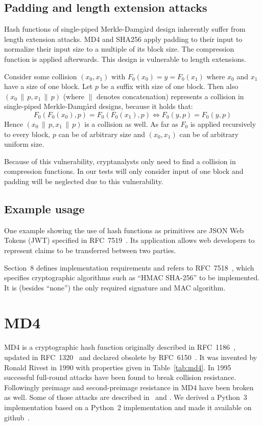 \subsection{Padding and length extension attacks}
\label{sec:hash-length-ext-attack}
%
Hash functions of single-piped Merkle-Damg\aa{}rd design inherently suffer
from length extension attacks. MD4 and SHA256 apply padding to their input
to normalize their input size to a multiple of its block size.
The compression function is applied afterwards. This design is vulnerable
to length extensions.

Consider some collision $(x_0, x_1)$ with $F_0(x_0) = y = F_0(x_1)$ where $x_0$ and
$x_1$ have a size of one block. Let $p$ be a suffix with size of one block.
Then also $(x_0 \,\|\, p, x_1 \,\|\, p)$ (where $\|$ denotes concatenation)
represents a collision in single-piped Merkle-Damg\aa{}rd designs, because
it holds that:
\[ F_0(F_0(x_0), p) = F_0(F_0(x_1), p) \iff F_0(y, p) = F_0(y, p) \]
Hence $(x_0 \,\|\, p, x_1 \,\|\, p)$ is a collision as well.
As far as $F_0$ is applied recursively to every block, $p$ can be of arbitrary size
and $(x_0, x_1)$ can be of arbitrary uniform size.

Because of this vulnerability, cryptanalysts only need to find a collision
in compression functions. In our tests will only consider input of one block
and padding will be neglected due to this vulnerability.

\subsection{Example usage}
\label{sec:hash-usage}
%
One example showing the use of hash functions as primitives are JSON Web Tokens (JWT)
specified in RFC~7519~\cite{rfc7519}. Its application allows web developers to
represent claims to be transferred between two parties.

Section~8 defines implementation requirements and refers to RFC~7518~\cite{rfc7518},
which specifies cryptographic algorithms such as \enquote{HMAC SHA-256} to be
implemented. It is (besides \enquote{none}) the only required signature and MAC algorithm.

\section{MD4}
\label{sec:dc-md4}
%
MD4 is a cryptographic hash function originally described in RFC~1186~\cite{rfc1186},
updated in RFC~1320~\cite{rfc1320} and declared obsolete by RFC~6150~\cite{rfc6150}. It was
invented by Ronald Rivest in 1990 with properties given in Table~\ref{tab:md4}.
In 1995~\cite{Dobbertin1998} successful full-round attacks have been found to break collision resistance.
Followingly preimage and second-preimage resistance in MD4 have been broken as well.
Some of those attacks are described in~\cite{md4-2007} and \cite{cryptoeprint:2005:151}.
We derived a Python~3 implementation based on a Python~2 implementation
and made it available on github~\cite{md4-py3k}.

